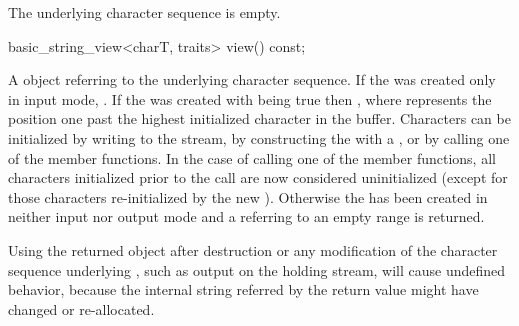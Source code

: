 \documentclass[ebook,11pt,article]{memoir}
\begin{document}
\begin{insrt}
\begin{itemdescr}
\pnum
\postcondition The underlying character sequence is empty.
\end{itemdescr}

\begin{itemdecl}
basic_string_view<charT, traits> view() const;
\end{itemdecl}
\begin{itemdescr}
\pnum
\returns A  object referring to the  underlying character sequence. If the  was created only in input mode,  . If the  was created with  being true then , where  represents the position one past the highest initialized character in the buffer. Characters can be initialized by writing to the stream, by constructing the  with a , or by calling one of the  member functions. In the case of calling one of the  member functions, all characters initialized prior to the call are now considered uninitialized (except for those characters re-initialized by the new ). Otherwise the  has been created in neither input nor output mode and a  referring to an empty range is returned. 

\pnum
\enternote
Using the returned  object after destruction or any modification of the character sequence underlying , such as output on the holding stream, will cause undefined behavior, because the internal string referred by the return value might have changed or re-allocated. 
\exitnote
\end{itemdescr}

\end{insrt}
\end{document}
